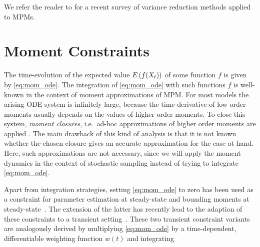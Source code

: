 
We refer the reader to \textcite{beentjes2021a} for a recent survey of variance reduction methods applied to \acp{MPM}.



\section{Moment Constraints}\label{sec:cv:moments}
The time-evolution of the expected value ${E}\left(f(X_t)\right)$ of some function $f$ is given by \eqref{eq:mom_ode}.
The integration of \eqref{eq:mom_ode} with such functions $f$ is well-known in the context of
moment approximations of \ac{MPM}.
For most models the arising \ac{ODE} system is infinitely large, because the time-derivative of
low order moments usually depends on the values of higher order moments.
To close this system, \emph{moment closures}, i.e.\ ad-hoc approximations of higher order moments
are applied \parencite{schnoerr2015}.
The main drawback of this kind of analysis is that it is not known whether the chosen closure gives
an accurate approximation for the case at hand.
Here, such approximations are not necessary, since we will apply the moment dynamics in the context
of stochastic sampling instead of trying to integrate \eqref{eq:mom_ode}.

Apart from integration strategies,
setting \eqref{eq:mom_ode} to zero has been used as a constraint for parameter estimation at steady-state
\parencite{backenkohler2018moment} and bounding moments at steady-state~\parencite{dowdy2018bounds,ghusinga2017exact,kuntz2017rigorous}.
The extension of the latter has recently lead to the adaption of these constraints
to a transient setting~\parencite{dowdy2018dynamic,sakurai2019bounding}.
These two transient constraint variants are analogously derived by multiplying \eqref{eq:mom_ode}
by a time-dependent, differentiable weighting function $w(t)$ and integrating


